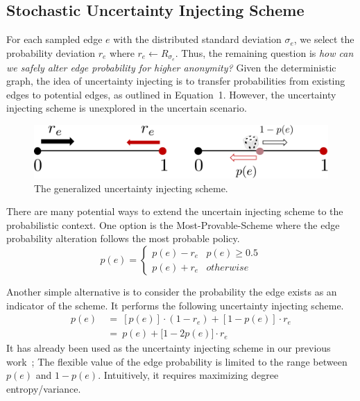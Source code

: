 \subsection{Stochastic Uncertainty Injecting Scheme}
For each sampled edge $e$ with the distributed standard deviation $\sigma_{e}$, we select the probability deviation $r_{e}$ where $r_{e} \leftarrow R_{\sigma_{e}}$. 
Thus, the remaining question is \emph{how can we safely alter edge probability for higher anonymity?}
Given the deterministic graph, the idea of uncertainty injecting is to transfer probabilities from existing edges to potential edges, as outlined in Equation~1.
However, the uncertainty injecting scheme is unexplored in the uncertain scenario.  
\begin{figure}[!htb]
  \centering
        \includegraphics[width=\linewidth]{figure/uncertaintyInjecting.pdf}
    \caption{The generalized uncertainty injecting scheme.}
\end{figure}
There are many potential ways to extend the uncertain injecting scheme to the probabilistic context.   
One option is the Most-Provable-Scheme where the edge probability alteration follows the most probable policy.
\begin{equation*}
  p(e) =
  \begin{cases}
     p(e)-r_{e}    & p(e) \ge 0.5 \\
     p(e)+r_{e}    & otherwise 
  \end{cases}
  \label{eq:inject}
\end{equation*}

Another simple alternative is to consider the probability the edge exists as an indicator of the scheme. 
It performs the following uncertainty injecting scheme.
\begin{align}
  p(e)~&=~ [p(e)] \cdot (1-r_{e})+ [1-p(e)] \cdot r_{e} \\
      ~&=~ p(e) + \big[ 1- 2 p(e) \big] \cdot r_{e}
  \label{eq:ui}
\end{align}
It has already been used as the uncertainty injecting scheme in our previous work~\cite{Xiao:2018}; 
The flexible value of the edge probability is limited to the range between $p(e)$ and $1-p(e)$.
Intuitively, it requires maximizing degree entropy/variance. 

